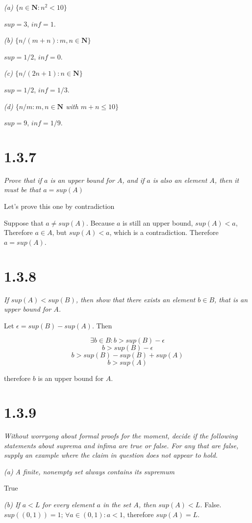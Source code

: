 \documentclass[11pt,oneside,titlepage]{book}
\begin{document}
\textit{(a) $\{n \in \textbf{N}: n^2 < 10\}$}

$sup = 3$, $inf = 1$.

\textit{(b) $\{n/(m + n): m,n\in \textbf{N}\}$}

$sup = 1/2$, $inf = 0$.

\textit{(c) $\{n/(2n + 1): n\in \textbf{N}\}$}

$sup = 1/2$, $inf = 1/3$.

\textit{(d) $\{n/m: m,n\in \textbf{N}$ with $m + n \leq 10\}$}

$sup = 9$, $inf = 1/9$.

\section*{1.3.7}
\textit{Prove that if $a$ is an upper bound for $A$, and if $a$ is also an
  element $A$, then it must be that $a = sup(A)$}

Let's prove this one by contradiction

Suppose that $a \neq sup(A)$. Because $a$ is still an upper bound, $sup(A) <
a$, Therefore $a \in A$, but $sup(A) < a$, which is a contradiction.
Therefore $a = sup(A)$.

\section*{1.3.8}
\textit{If $sup(A) < sup(B)$, then show that there exists an element $b \in B$,
  that is an upper bound for $A$.}

Let $\epsilon = sup(B) - sup(A)$. Then

$$\exists b \in B: b > sup(B) - \epsilon$$
$$ b > sup(B) - \epsilon $$
$$ b > sup(B) - sup(B) + sup(A) $$
$$ b > sup(A) $$

therefore $b$ is an upper bound for $A$.

\section*{1.3.9}
\textit{Without worryong about formal proofs for the moment, decide if the
  following statements about suprema and infima are true or false. For any that
  are false, supply an example where the claim in question does not appear to
  hold.}

\textit{(a) A finite, nonempty set always contains its supremum}

True

\textit{(b) If $a < L$ for every element $a$ in the set $A$, then $sup(A) <
  L$.}
False. $sup((0, 1)) = 1$; $\forall a \in (0, 1): a < 1$, therefore $sup(A) = L$.
\end{document}
